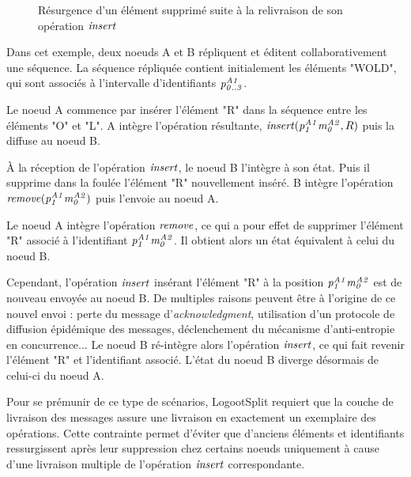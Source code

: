 \begin{figure}[!ht]
{
  }
  \caption{Résurgence d'un élément supprimé suite à la relivraison de son opération $\mathit{insert}$}
  \label{fig:why-exactly-once-delivery}
\end{figure}

Dans cet exemple, deux noeuds A et B répliquent et éditent collaborativement une séquence.
La séquence répliquée contient initialement les éléments "WOLD", qui sont associés à l'intervalle d'identifiants $\mathit{p}^{\mathit{A1}}_{\mathit{0..3}}$.

Le noeud A commence par insérer l'élément "R" dans la séquence entre les éléments "O" et "L".
A intègre l'opération résultante, $\mathit{insert}(\mathit{p}^{\mathit{A1}}_{\mathit{1}}\mathit{m}^{\mathit{A2}}_{\mathit{0}},R)$ puis la diffuse au noeud B.

À la réception de l'opération $\mathit{insert}$, le noeud B l'intègre à son état.
Puis il supprime dans la foulée l'élément "R" nouvellement inséré.
B intègre l'opération $\mathit{remove}(\mathit{p}^{\mathit{A1}}_{\mathit{1}}\mathit{m}^{\mathit{A2}}_{\mathit{0}})$ puis l'envoie au noeud A.

Le noeud A intègre l'opération $\mathit{remove}$, ce qui a pour effet de supprimer l'élément "R" associé à l'identifiant $\mathit{p}^{\mathit{A1}}_{\mathit{1}}\mathit{m}^{\mathit{A2}}_{\mathit{0}}$.
Il obtient alors un état équivalent à celui du noeud B.

Cependant, l'opération $\mathit{insert}$ insérant l'élément "R" à la position $\mathit{p}^{\mathit{A1}}_{\mathit{1}}\mathit{m}^{\mathit{A2}}_{\mathit{0}}$ est de nouveau envoyée au noeud B.
De multiples raisons peuvent être à l'origine de ce nouvel envoi : perte du message d'\emph{acknowledgment}, utilisation d'un protocole de diffusion épidémique des messages, déclenchement du mécanisme d'anti-entropie en concurrence...
Le noeud B ré-intègre alors l'opération $\mathit{insert}$, ce qui fait revenir l'élément "R" et l'identifiant associé.
L'état du noeud B diverge désormais de celui-ci du noeud A.

Pour se prémunir de ce type de scénarios, LogootSplit requiert que la couche de livraison des messages assure une livraison en exactement un exemplaire des opérations.
Cette contrainte permet d'éviter que d'anciens éléments et identifiants ressurgissent après leur suppression chez certains noeuds uniquement à cause d'une livraison multiple de l'opération $\mathit{insert}$ correspondante.

